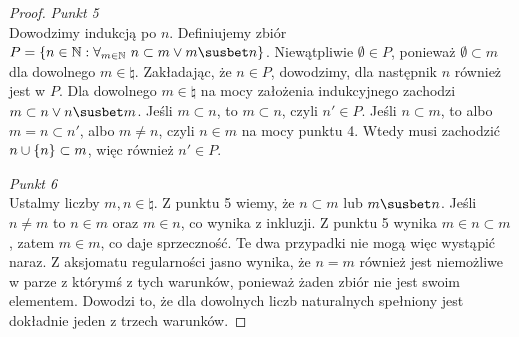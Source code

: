 \begin{proof}
    \textit{Punkt 5}\\
    Dowodzimy indukcją po \( n \). Definiujemy zbiór \( P = \set{n \in \natural : \forall_{m \in \natural} \ n \subset m \lor m \susbet n} \).
    Niewątpliwie \( \emptyset \in P \), ponieważ \( \emptyset \subset m \) dla dowolnego \( m \in \natural \). Zakładając, że \( n \in P \), dowodzimy, dla następnik \( n \) również jest w \( P \).
    Dla dowolnego \( m \in \natural \) na mocy założenia indukcyjnego zachodzi \( m \subset n \lor n \susbet m \). Jeśli \( m \subset n \), to \( m \subset n \), czyli \( n' \in P \).
    Jeśli \( n \subset m \), to albo \( m = n \subset n' \), albo \( m \ne n \), czyli \( n \in m \) na mocy punktu 4. Wtedy musi zachodzić \( n \cup \set{n} \subset m \), więc również \( n' \in P \).

    \textit{Punkt 6}\\
    Ustalmy liczby \( m, n \in \natural \). Z punktu 5 wiemy, że \( n \subset m \) lub \( m \susbet n \). Jeśli \( n \ne m \) to \( n \in m \) oraz \( m \in n \), co wynika z inkluzji.
    Z punktu 5 wynika \( m \in n \subset m \), zatem \( m \in m \), co daje sprzeczność. Te dwa przypadki nie mogą więc wystąpić naraz. Z aksjomatu regularności jasno wynika, że \( n = m \) również jest niemożliwe w parze z którymś z tych warunków, ponieważ żaden zbiór nie jest swoim elementem.
    Dowodzi to, że dla dowolnych liczb naturalnych spełniony jest dokładnie jeden z trzech warunków.
\end{proof}
